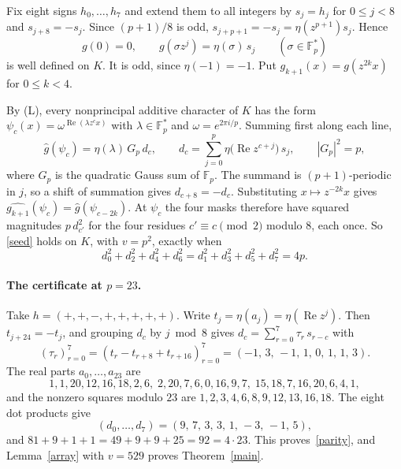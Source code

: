 \documentclass[11pt]{article}
\theoremstyle{remark}
\newcommand{\F}{\mathbb F}
\begin{document}
Fix eight signs $h_0,\dots,h_7$ and extend them to all integers by $s_j=h_j$ for $0\le j<8$ and $s_{j+8}=-s_j$. Since $(p+1)/8$ is odd, $s_{j+p+1}=-s_j=\eta(z^{p+1})s_j$. Hence
\[
g(0)=0,\qquad g(\sigma z^j)=\eta(\sigma)\,s_j\qquad(\sigma\in\F_p^*)
\]
is well defined on $K$. It is odd, since $\eta(-1)=-1$. Put $g_{k+1}(x)=g(z^{2k}x)$ for $0\le k<4$.

By (L), every nonprincipal additive character of $K$ has the form $\psi_c(x)=\omega^{\operatorname{Re}(\lambda z^cx)}$ with $\lambda\in\F_p^*$ and $\omega=e^{2\pi i/p}$. Summing first along each line,
\[
\widehat g(\psi_c)=\eta(\lambda)\,G_p\,d_c,\qquad
d_c=\sum_{j=0}^{p}\eta\big(\operatorname{Re}z^{c+j}\big)\,s_j,\qquad|G_p|^2=p,
\]
where $G_p$ is the quadratic Gauss sum of $\F_p$. The summand is $(p+1)$-periodic in $j$, so a shift of summation gives $d_{c+8}=-d_c$. Substituting $x\mapsto z^{-2k}x$ gives $\widehat{g_{k+1}}(\psi_c)=\widehat g(\psi_{c-2k})$. At $\psi_c$ the four masks therefore have squared magnitudes $p\,d_{c'}^2$ for the four residues $c'\equiv c\pmod 2$ modulo $8$, each once. So \eqref{seed} holds on $K$, with $v=p^2$, exactly when
\begin{equation}\label{parity}
d_0^2+d_2^2+d_4^2+d_6^2=d_1^2+d_3^2+d_5^2+d_7^2=4p.
\end{equation}

\paragraph{The certificate at $p=23$.}
Take $h=(+,+,-,+,+,+,+,+)$. Write $t_j=\eta(a_j)=\eta(\operatorname{Re}z^j)$. Then $t_{j+24}=-t_j$, and grouping $d_c$ by $j\bmod 8$ gives $d_c=\sum_{r=0}^7\tau_r\,s_{r-c}$ with
\[
(\tau_r)_{r=0}^{7}=(t_r-t_{r+8}+t_{r+16})_{r=0}^{7}=(-1,\,3,\,-1,\,1,\,0,\,1,\,1,\,3).
\]
The real parts $a_0,\dots,a_{23}$ are
\[
1,1,20,12,16,18,2,6,\;2,20,7,6,0,16,9,7,\;15,18,7,16,20,6,4,1,
\]
and the nonzero squares modulo $23$ are $1,2,3,4,6,8,9,12,13,16,18$. The eight dot products give
\[
(d_0,\dots,d_7)=(9,\,7,\,3,\,3,\,1,\,-3,\,-1,\,5),
\]
and $81+9+1+1=49+9+9+25=92=4\cdot23$. This proves~\eqref{parity}, and Lemma~\ref{array} with $v=529$ proves Theorem~\ref{main}.
\end{document}

